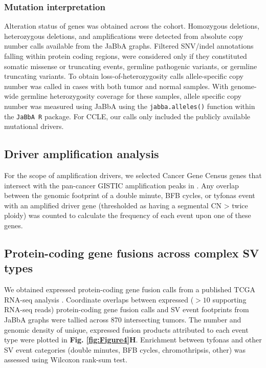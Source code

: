 \documentclass[phd,tocprelim]{cornell}
\newcommand{\ttt}[1]{\texttt{#1}}
\begin{document}
\subsubsection*{Mutation interpretation}
Alteration status of genes was obtained across the cohort. Homozygous deletions, heterozygous deletions, and amplifications were detected from absolute copy number calls available from the JaBbA graphs. Filtered SNV/indel annotations falling within protein coding regions, were considered only if they constituted somatic missense or truncating events, germline pathogenic variants, or germline truncating variants. To obtain loss-of-heterozygosity calls allele-specific copy number was called in cases with both tumor and normal samples. With genome-wide germline heterozygosity coverage for these samples, allele specific copy number was measured using JaBbA using the \ttt{jabba.alleles()} function within the \texttt{JaBbA R} package. For CCLE, our calls only included the publicly available mutational drivers.

\subsection*{Driver amplification analysis}

For the scope of amplification drivers, we selected Cancer Gene Census genes that intersect with the pan-cancer GISTIC amplification peaks in \cite{Zack:2013f1f}. Any overlap between the genomic footprint of a double minute, BFB cycles, or tyfonas event with an amplified driver gene (thresholded as having a segmental CN > twice ploidy) was counted to calculate the frequency of each event upon one of these genes.

\subsection*{Protein-coding gene fusions across complex SV types}
We obtained expressed protein-coding gene fusion calls from a published TCGA RNA-seq analysis \cite{Dehghannasiri2019-hk}.  Coordinate overlaps between expressed ($>10$ supporting RNA-seq reads) protein-coding gene fusion calls and SV event footprints from JaBbA graphs were tallied across 870 intersecting tumors. The number and genomic density of unique, expressed fusion products attributed to each event type were plotted in \textbf{Fig. \ref{fig:Figure4}H}.  Enrichment between tyfonas and other SV event categories (double minutes, BFB cycles, chromothripsis, other) was assessed using Wilcoxon rank-sum test.
\end{document}
